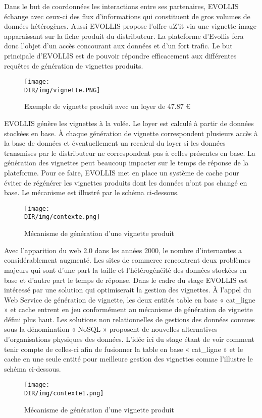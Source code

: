 Dans le but de coordonnées les interactions entre ses partenaires, \textsf{EVOLLIS} 
échange avec ceux-ci des flux d'informations qui constituent de gros volumes de 
données hétérogènes. Aussi \textsf{EVOLLIS} propose l'offre \textsf{uZ'it} via une 
vignette image apparaissant sur la fiche produit du distributeur. La plateforme
d'Evollis fera donc l'objet d'un accès concourant aux données et d'un fort trafic.
Le but principale d'\textsf{EVOLLIS} est de pouvoir répondre efficacement aux 
différentes requêtes de génération de vignettes produits.
\begin {figure}[H]
       \centering
        \texttt{[image: \\DIR/img/vignette.PNG]}	
        \caption{Exemple de vignette produit avec un loyer de 47.87 €}
	\label{sqoop}
  \end {figure}    
\noindent
\textsf{EVOLLIS} génère les vignettes à la volée. Le loyer est calculé à partir de 
données stockées en base. À chaque génération de vignette correspondent plusieurs 
accès à la base de données et éventuellement un recalcul du loyer si les données 
transmises par le distributeur ne correspondent pas à celles présentes en base.
La génération des vignettes peut beaucoup impacter sur le temps de réponse de 
la plateforme. Pour ce faire, \textsf{EVOLLIS} met en place un système de cache
pour éviter de régénérer les vignettes produits dont les données n'ont pas changé en base. 
Le mécanisme est illustré par le schéma ci-dessous.
\begin {figure}[H]
       \centering
        \texttt{[image: \\DIR/img/contexte.png]}	
        \caption{Mécanisme de génération d'une vignette produit}
	\label{sqoop}
  \end {figure}    
\noindent
Avec l'apparition du \textsf{web 2.0} dans les années $2000$, le nombre d'internautes 
a considérablement augmenté. Les sites de commerce rencontrent deux problèmes majeurs
qui sont d'une part la taille et l'hétérogénéité des données stockées en base et d'autre part
le temps de réponse. Dans le cadre du stage \textsf{EVOLLIS} est intéressé par une solution
qui optimiserait la gestion des vignettes. À l'appel du \textsf{Web Service} de génération
de vignette, les deux entités table en base « \textsf{cat\_ligne} » et cache entrent en jeu 
conformément au mécanisme de génération de vignette défini plus haut. Les solutions non 
relationnelles de gestions des données connues sous la dénomination « \textsf{NoSQL} » 
proposent de nouvelles alternatives d'organisations physiques des données. L'idée ici du stage 
étant de voir comment tenir compte de celles-ci afin de fusionner la table en base 
« \textsf{cat\_ligne} » et le cache en une seule entité pour meilleure gestion des vignettes comme
l'illustre le schéma ci-dessous. 
\begin {figure}[H]
       \centering
        \texttt{[image: \\DIR/img/contexte1.png]}	
        \caption{Mécanisme de génération d'une vignette produit}
	\label{sqoop}
  \end {figure}    

